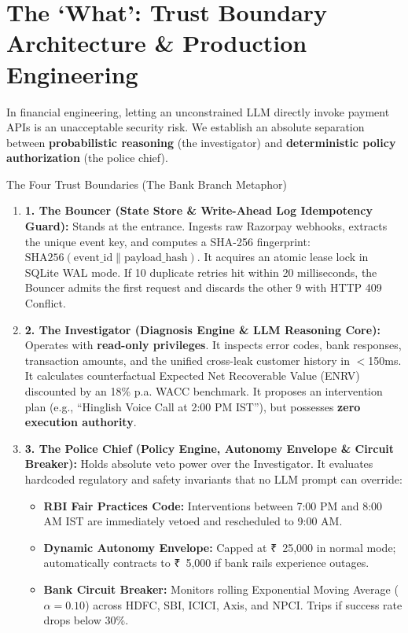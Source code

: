 \documentclass[11pt, a4paper]{article}
\newcommand{\INR}{{\rupeefont ₹}}
\begin{document}
\newpage
\section{The `What': Trust Boundary Architecture \& Production Engineering}

In financial engineering, letting an unconstrained LLM directly invoke payment APIs is an unacceptable security risk. We establish an absolute separation between \textbf{probabilistic reasoning} (the investigator) and \textbf{deterministic policy authorization} (the police chief).

\begin{calloutbox}{The Four Trust Boundaries (The Bank Branch Metaphor)}
\begin{enumerate}[leftmargin=1.5em, itemsep=6pt]
  \item \textbf{1. The Bouncer (State Store \& Write-Ahead Log Idempotency Guard):}
  Stands at the entrance. Ingests raw Razorpay webhooks, extracts the unique event key, and computes a SHA-256 fingerprint: $\text{SHA256}(\text{event\_id} \parallel \text{payload\_hash})$. It acquires an atomic lease lock in SQLite WAL mode. If 10 duplicate retries hit within 20 milliseconds, the Bouncer admits the first request and discards the other 9 with HTTP 409 Conflict.
  
  \item \textbf{2. The Investigator (Diagnosis Engine \& LLM Reasoning Core):}
  Operates with \textbf{read-only privileges}. It inspects error codes, bank responses, transaction amounts, and the unified cross-leak customer history in $<$150ms. It calculates counterfactual Expected Net Recoverable Value (ENRV) discounted by an 18\% p.a. WACC benchmark. It proposes an intervention plan (e.g., ``Hinglish Voice Call at 2:00 PM IST''), but possesses \textbf{zero execution authority}.
  
  \item \textbf{3. The Police Chief (Policy Engine, Autonomy Envelope \& Circuit Breaker):}
  Holds absolute veto power over the Investigator. It evaluates hardcoded regulatory and safety invariants that no LLM prompt can override:
  \begin{itemize}[leftmargin=1.2em, itemsep=2pt]
    \item \textbf{RBI Fair Practices Code:} Interventions between 7:00 PM and 8:00 AM IST are immediately vetoed and rescheduled to 9:00 AM.
    \item \textbf{Dynamic Autonomy Envelope:} Capped at \INR~25,000 in normal mode; automatically contracts to \INR~5,000 if bank rails experience outages.
    \item \textbf{Bank Circuit Breaker:} Monitors rolling Exponential Moving Average ($\alpha = 0.10$) across HDFC, SBI, ICICI, Axis, and NPCI. Trips if success rate drops below 30\%.
  \end{itemize}
  

\end{enumerate}
\end{calloutbox}
\end{document}
